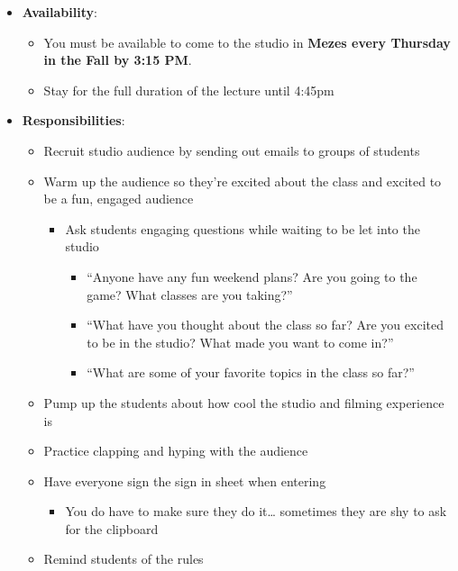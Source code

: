 \documentclass[
]{article}
\providecommand{\tightlist}{%
  \setlength{\itemsep}{0pt}\setlength{\parskip}{0pt}}
\begin{document}
\begin{itemize}
\tightlist
\item
  \textbf{Availability}:

  \begin{itemize}
  \tightlist
  \item
    You must be available to come to the studio in \textbf{Mezes every Thursday in the Fall by 3:15 PM}.
  \item
    Stay for the full duration of the lecture until 4:45pm
  \end{itemize}
\item
  \textbf{Responsibilities}:

  \begin{itemize}
  \tightlist
  \item
    Recruit studio audience by sending out emails to groups of students
  \item
    Warm up the audience so they're excited about the class and excited to be a fun, engaged audience

    \begin{itemize}
    \tightlist
    \item
      Ask students engaging questions while waiting to be let into the studio

      \begin{itemize}
      \tightlist
      \item
        ``Anyone have any fun weekend plans? Are you going to the game? What classes are you taking?''
      \item
        ``What have you thought about the class so far? Are you excited to be in the studio? What made you want to come in?''
      \item
        ``What are some of your favorite topics in the class so far?''
      \end{itemize}
    \end{itemize}
  \item
    Pump up the students about how cool the studio and filming experience is
  \item
    Practice clapping and hyping with the audience
  \item
    Have everyone sign the sign in sheet when entering

    \begin{itemize}
    \tightlist
    \item
      You do have to make sure they do it\ldots{} sometimes they are shy to ask for the clipboard
    \end{itemize}
  \item
    Remind students of the rules


\end{itemize}
\end{itemize}
\end{document}
